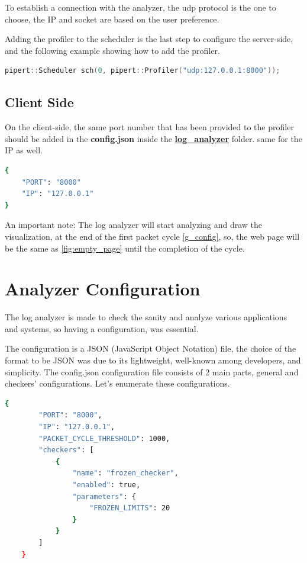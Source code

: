 To establish a connection with the analyzer, the udp protocol
is the one to choose, the IP and socket are based on the user
preference.

Adding the profiler to the scheduler is the last step to configure
the server-side, and the following example showing how to add the profiler.

\begin{lstlisting}[language=c++, caption={Adding profiler},captionpos=b]
	pipert::Scheduler sch(0, pipert::Profiler("udp:127.0.0.1:8000"));
\end{lstlisting}

\subsection{Client Side}\label{client_side}
On the client-side, the same port number that has been provided to the profiler
should be added in the \textbf{config.json} inside the \textbf{\url{log_analyzer}} folder. same for
the IP as well.

\begin{lstlisting}[language=bash, caption={connection configuration},captionpos=b]
{
	"PORT": "8000"
	"IP": "127.0.0.1"
}
\end{lstlisting}

An important note: The log analyzer will start analyzing and
draw the visualization, at the end of the first packet cycle \ref{g_config}, so, 
the web page will be the same as \ref{fig:empty_page} 
until the completion of the cycle.

\section{Analyzer Configuration}
The log analyzer is made to check the sanity and analyze various
applications and systems, so having a configuration, was essential.

The configuration is a JSON (JavaScript Object Notation) file,
the choice of the format to be JSON was due to its
lightweight, well-known among developers, and simplicity. 
The config.json configuration file consists of 2 main parts, 
general and checkers' configurations. Let's enumerate these configurations.

\begin{lstlisting}[language=bash, caption={Sample configuration},captionpos=b, label={lst:sample_confing}]
	{
		"PORT": "8000",
		"IP": "127.0.0.1",
		"PACKET_CYCLE_THRESHOLD": 1000,
		"checkers": [
			{
				"name": "frozen_checker",
				"enabled": true,
				"parameters": {
					"FROZEN_LIMITS": 20
				}
			}
		]
	}
\end{lstlisting}

